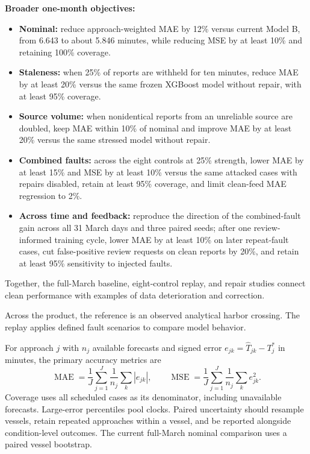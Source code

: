 \documentclass[11pt]{article}
\begin{document}
\clearpage
\textbf{Broader one-month objectives:}
\begin{itemize}
\item \textbf{Nominal:} reduce approach-weighted MAE by 12\% versus current Model B, from 6.643 to about 5.846 minutes, while reducing MSE by at least 10\% and retaining 100\% coverage.
\item \textbf{Staleness:} when 25\% of reports are withheld for ten minutes, reduce MAE by at least 20\% versus the same frozen XGBoost model without repair, with at least 95\% coverage.
\item \textbf{Source volume:} when nonidentical reports from an unreliable source are doubled, keep MAE within 10\% of nominal and improve MAE by at least 20\% versus the same stressed model without repair.
\item \textbf{Combined faults:} across the eight controls at 25\% strength, lower MAE by at least 15\% and MSE by at least 10\% versus the same attacked cases with repairs disabled, retain at least 95\% coverage, and limit clean-feed MAE regression to 2\%.
\item \textbf{Across time and feedback:} reproduce the direction of the combined-fault gain across all 31 March days and three paired seeds; after one review-informed training cycle, lower MAE by at least 10\% on later repeat-fault cases, cut false-positive review requests on clean reports by 20\%, and retain at least 95\% sensitivity to injected faults.
\end{itemize}


Together, the full-March baseline, eight-control replay, and repair studies connect clean performance with examples of data deterioration and correction.

Across the product, the reference is an observed analytical harbor crossing. The replay applies defined fault scenarios to compare model behavior.

For approach $j$ with $n_j$ available forecasts and signed error $e_{jk}=\widehat T_{jk}-T_j^*$ in minutes, the primary accuracy metrics are
\[
 \operatorname{MAE}=\frac1J\sum_{j=1}^J\frac1{n_j}\sum_k|e_{jk}|,
 \qquad
 \operatorname{MSE}=\frac1J\sum_{j=1}^J\frac1{n_j}\sum_k e_{jk}^2.
\]
Coverage uses all scheduled cases as its denominator, including unavailable forecasts. Large-error percentiles pool clocks. Paired uncertainty should resample vessels, retain repeated approaches within a vessel, and be reported alongside condition-level outcomes. The current full-March nominal comparison uses a paired vessel bootstrap.
\end{document}
